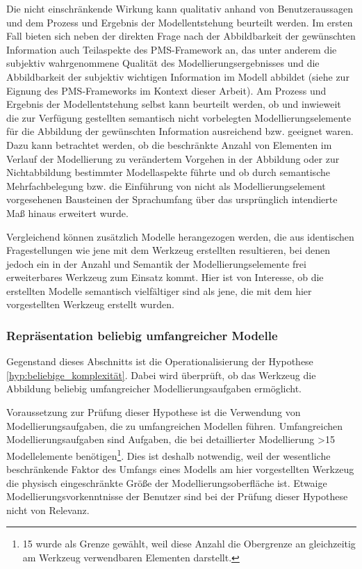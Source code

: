 Die nicht einschränkende Wirkung kann qualitativ anhand von Benutzeraussagen und dem Prozess und Ergebnis der Modellentstehung beurteilt werden. Im ersten Fall bieten sich neben der direkten Frage nach der Abbildbarkeit der gewünschten Information auch Teilaspekte des \gls{PMS}-Framework \citep{Sedera02} an, das unter anderem die subjektiv wahrgenommene Qualität des Modellierungsergebnisses und die Abbildbarkeit der subjektiv wichtigen Information im Modell abbildet (siehe \citep{Wahlmuller10} zur Eignung des \gls{PMS}-Frameworks im Kontext dieser Arbeit). Am Prozess und Ergebnis der Modellentstehung selbst kann beurteilt werden, ob und inwieweit die zur Verfügung gestellten semantisch nicht vorbelegten Modellierungselemente für die Abbildung der gewünschten Information ausreichend bzw. geeignet waren. Dazu kann betrachtet werden, ob die beschränkte Anzahl von Elementen im Verlauf der Modellierung zu verändertem Vorgehen in der Abbildung oder zur Nichtabbildung bestimmter Modellaspekte führte und ob durch semantische Mehrfachbelegung bzw. die Einführung von nicht als Modellierungselement vorgesehenen Bausteinen der Sprachumfang über das ursprünglich intendierte Maß hinaus erweitert wurde. 

Vergleichend können zusätzlich Modelle herangezogen werden, die aus identischen Fragestellungen wie jene mit dem Werkzeug erstellten resultieren, bei denen jedoch ein in der Anzahl und Semantik der Modellierungselemente frei erweiterbares Werkzeug zum Einsatz kommt. Hier ist von Interesse, ob die erstellten Modelle semantisch vielfältiger sind als jene, die mit dem hier vorgestellten Werkzeug erstellt wurden.


\subsubsection{Repräsentation beliebig umfangreicher Modelle} %
\label{ssub:repräsentation_beliebig_komplexer_modelle}

Gegenstand dieses Abschnitts ist die Operationalisierung der Hypothese \ref{hyp:beliebige_komplexität}. Dabei wird überprüft, ob das Werkzeug die Abbildung beliebig umfangreicher Modellierungsaufgaben ermöglicht.

Voraussetzung zur Prüfung dieser Hypothese ist die Verwendung von Modellierungsaufgaben, die zu umfangreichen Modellen führen. Umfangreichen Modellierungsaufgaben sind Aufgaben, die bei detaillierter Modellierung >15 Modellelemente benötigen\footnote{15 wurde als Grenze gewählt, weil diese Anzahl die Obergrenze an gleichzeitig am Werkzeug verwendbaren Elementen darstellt.}. Dies ist deshalb notwendig, weil der wesentliche beschränkende Faktor des Umfangs eines Modells am hier vorgestellten Werkzeug die physisch eingeschränkte Größe der Modellierungsoberfläche ist. Etwaige Modellierungsvorkenntnisse der Benutzer sind bei der Prüfung dieser Hypothese nicht von Relevanz.

